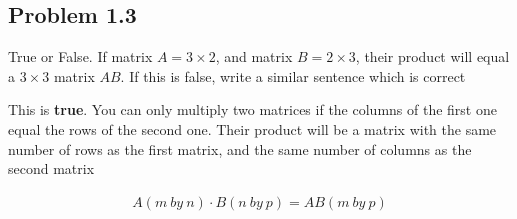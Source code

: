 \documentclass[12pt]{article}
\begin{document}
\subsection{Problem 1.3}\label{p1.3}
\begin{tcolorbox}[title=Problem 1.3]
True or False. If matrix $ A = 3 \times 2 $, and matrix $ B = 2 \times 3 $, their product will equal a $ 3 \times 3 $ matrix $ AB $. If this is false, write a similar sentence which is correct
\end{tcolorbox}
This is \textbf{true}. You can only multiply two matrices if the columns of the first one equal the rows of the second one. Their product will be a matrix with the same number of rows as the first matrix, and the same number of columns as the second matrix

\begin{align*}
    A (m\ by\ n) \cdot B (n\ by\ p) = AB (m\ by\ p)
\end{align*}
\end{document}
